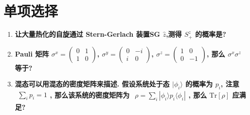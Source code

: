 \documentclass[../../main.tex]{subfiles}
\begin{document}
\section{单项选择}
\begin{enumerate}
  \item \textbf{让大量热化的自旋通过 Stern-Gerlach 装置SG $\hat{z}$,测得 $S^{z}_{+}$ 的概率是?}

  {}

  \item \textbf{Pauli 矩阵 $\sigma^{x}=\begin{pmatrix}
    0 & 1\\
    1 & 0
  \end{pmatrix}$, $\sigma^{y}=\begin{pmatrix}
    0 & -i\\
    i & 0
  \end{pmatrix}$, $\sigma^{z}=\begin{pmatrix}
    1 & 0\\
    0 & -1
  \end{pmatrix}$, 那么 $\sigma^{x}\sigma^{z}$ 等于?}

{}

  \item \textbf{混态可以用混态的密度矩阵来描述. 假设系统处于态 $|\phi_{i}\rangle$ 的概率为 $p_{i}$, 注意 $\begin{aligned}
    \sum_{i}p_{i} = 1
  \end{aligned}$, 那么该系统的密度矩阵为 $\begin{aligned}
    \rho = \sum_{i}|\phi_{i}\rangle p_{i}\langle\phi_{i}|
  \end{aligned}$, 那么 $\text{Tr}[\rho]$ 应满足?}
  

\end{enumerate}
\end{document}
